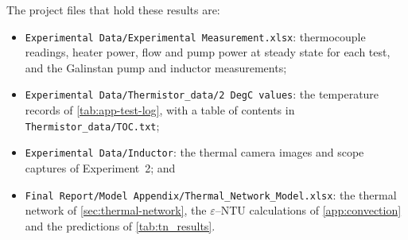 The project files that hold these results are:
\begin{itemize}
  \item \texttt{Experimental Data/Experimental Measurement.xlsx}: thermocouple
    readings, heater power, flow and pump power at steady state for each test,
    and the Galinstan pump and inductor measurements;
  \item \texttt{Experimental Data/Thermistor\_data/2 DegC values}: the
    temperature records of \cref{tab:app-test-log}, with a table of contents in
    \texttt{Thermistor\_data/TOC.txt};
  \item \texttt{Experimental Data/Inductor}: the thermal camera images and scope
    captures of Experiment~2; and
  \item \texttt{Final Report/Model Appendix/Thermal\_Network\_Model.xlsx}: the
    thermal network of \cref{sec:thermal-network}, the $\varepsilon$--NTU
    calculations of \cref{app:convection} and the predictions of
    \cref{tab:tn_results}.
\end{itemize}
